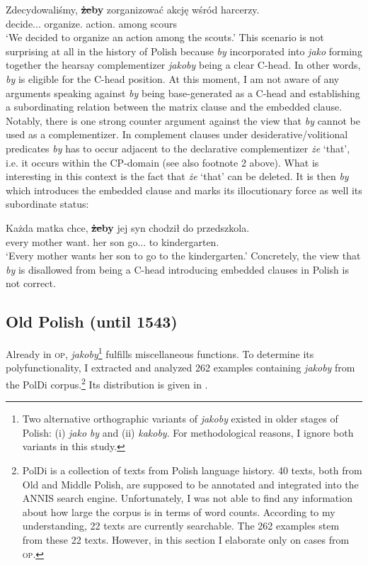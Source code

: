 \documentclass[output=paper]{langsci/langscibook}
\begin{document}
{\ea \gll Zdecydowaliśmy, \textbf{\sout{że}by} zorganizować akcję wśród harcerzy. \\
		decide.{\lptcp}.{\vir}.{\firstperson}{\pl} {\comp} organize.{\infv} action.{\acc} among scours \\
\glt	 `We decided to organize an action among the scouts.'
\z
This scenario is not surprising at all in the history of Polish because \emph{by} incorporated into \emph{jako} forming together the hearsay complementizer \emph{jakoby} being a clear C-head. In other words, \emph{by} is eligible for the C-head position. At this moment, I am not aware of any arguments speaking against \emph{by} being base-generated as a C-head and establishing a subordinating relation between the matrix clause and the embedded clause. Notably, there is one strong counter argument against the view that \emph{by} cannot be used as a complementizer. In complement clauses under desiderative\slash volitional predicates \emph{by} has to occur adjacent to the declarative complementizer \emph{że} `that', i.e. it occurs within the CP-domain (see also footnote 2 above).  What is interesting in this context is the fact that \emph{że} `that' can be deleted. It is then \emph{by} which introduces the embedded clause and marks its illocutionary force as well its subordinate status:

\ea \gll Każda matka chce, {\textbf{\sout{że}by}} jej syn chodził do przedszkola. \\
		every mother want.{\thirdperson}{\sg} {\comp} her son go.{\lptcp}.{\sg}.{\masc} to kindergarten.{\gen} \\
\glt	`Every mother wants her son to go to the kindergarten.'
\z
Concretely, the view that \emph{by} is disallowed from being a C-head introducing embedded clauses in Polish is not correct.
}

\subsection{Old Polish (until 1543)}

Already in \textsc{op}, \emph{jakoby}\footnote{Two alternative orthographic variants of \emph{jakoby} existed in older stages of Polish: (i) \emph{jako} \emph{by} and (ii) \emph{kakoby}. For methodological reasons, I ignore both variants in this study.
}
 fulfills miscellaneous functions. To determine its polyfunctionality, I extracted and analyzed 262 examples containing \emph{jakoby} from the PolDi corpus.\footnote{PolDi is a collection of texts from Polish language history. 40 texts, both from Old and Middle Polish, are supposed to be annotated and integrated into the ANNIS search engine. Unfortunately, I was not able to find any information about how large the corpus is in terms of word counts. According to my understanding, 22 texts are currently searchable. The 262 examples stem from these 22 texts. However, in this section I elaborate only on cases from \textsc{op}.

}
Its distribution is given in .
\end{document}

